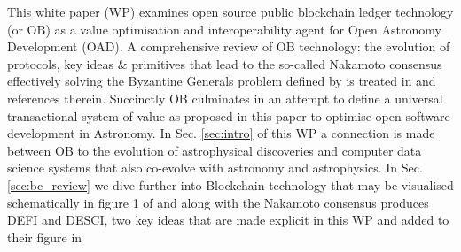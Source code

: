 \documentclass[final,5p,times,twocolumn,authoryear]{elsarticle}
\begin{document}
This white paper (WP) examines open source public blockchain ledger technology (or OB) as a value optimisation and interoperability agent for Open Astronomy Development (OAD). A comprehensive review of OB technology: the evolution of protocols, key ideas \& primitives that lead to the so-called Nakamoto consensus effectively solving the Byzantine Generals problem defined by \cite{Lamport1982TheBG} is treated in  \cite{arvindandclark2017} and references therein. Succinctly OB culminates in an attempt to define a universal transactional system of value as proposed in this paper to optimise open software development in Astronomy. In Sec. \ref{sec:intro} of this WP a connection is made between OB to the evolution of astrophysical discoveries and computer data science systems that also co-evolve with astronomy and astrophysics. In Sec. \ref{sec:bc_review} we dive further into Blockchain technology that may be visualised schematically in figure 1 of \cite{arvindandclark2017} and along with the Nakamoto consensus produces DEFI and DESCI, two key ideas that are made explicit in this WP and added to their figure in
\end{document}
